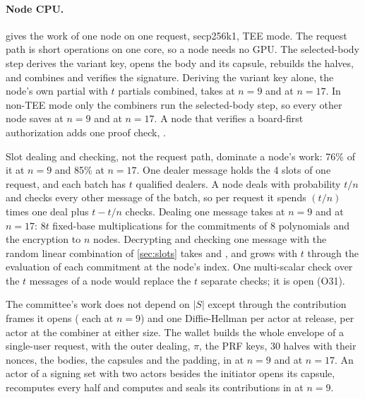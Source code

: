 \paragraph{Node CPU.}  gives the work of one node on one request, secp256k1, TEE mode. The request path is short operations on one core, so a node needs no GPU. The selected-body step derives the variant key, opens the body and its capsule, rebuilds the halves, and combines and verifies the signature. Deriving the variant key alone, the node's own partial with $t$ partials combined, takes \estCpuVariantKey{} at $n = 9$ and \estCpuVariantKeySeventeen{} at $n = 17$. In non-TEE mode only the combiners run the selected-body step, so every other node saves \estNonTeeSaveNine{} at $n = 9$ and \estNonTeeSaveSeventeen{} at $n = 17$. A node that verifies a board-first authorization adds one proof check, \estBoardFirstCheck.

Slot dealing and checking, not the request path, dominate a node's work: 76\% of it at $n = 9$ and 85\% at $n = 17$. One dealer message holds the 4 slots of one request, and each batch has $t$ qualified dealers. A node deals with probability $t/n$ and checks every other message of the batch, so per request it spends $(t/n)$ times one deal plus $t - t/n$ checks. Dealing one message takes \estSlotDealNine{} at $n = 9$ and \estSlotDealSeventeen{} at $n = 17$: $8t$ fixed-base multiplications for the commitments of 8 polynomials and the encryption to $n$ nodes. Decrypting and checking one message with the random linear combination of \cref{sec:slots} takes \estSlotCheckNine{} and \estSlotCheckSeventeen, and grows with $t$ through the evaluation of each commitment at the node's index. One multi-scalar check over the $t$ messages of a node would replace the $t$ separate checks; it is open (O31).

The committee's work does not depend on $|S|$ except through the contribution frames it opens (\estFrameOpen{} each at $n = 9$) and one Diffie-Hellman per actor at release, \estActorRelease{} per actor at the combiner at either size. The wallet builds the whole envelope of a single-user request, with the outer dealing, $\pi$, the PRF keys, 30 halves with their nonces, the bodies, the capsules and the padding, in \estWalletNine{} at $n = 9$ and \estWalletSeventeen{} at $n = 17$. An actor of a signing set with two actors besides the initiator opens its capsule, recomputes every half and computes and seals its contributions in \estActorWork{} at $n = 9$.

